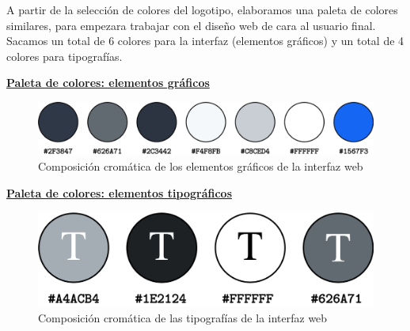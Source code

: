 \documentclass[../ei103948-project-documentation.tex]{subfiles}
\begin{document}
                            A partir de la selección de colores del logotipo, elaboramos una paleta de colores similares, para empezara trabajar con el diseño web de cara al usuario final.\\

                            Sacamos un total de 6 colores para la interfaz (elementos gráficos) y un total de 4 colores para tipografías.\\

                            \begin{center}
                                \underline{\textbf{Paleta de colores: elementos gráficos}}
                            \end{center}

                            \begin{figure}[H]
                                \begin{center}
                                \includegraphics[scale=0.065]{images/ColorTyposNoTable.png}
                                \end{center}
                                \caption{Composición cromática de los elementos gráficos de la interfaz web}
                            \end{figure}

                            \vspace{5mm}
                            \begin{center}
                                \underline{\textbf{Paleta de colores: elementos tipográficos}}
                            \end{center}

                            \begin{figure}[H]
                                \begin{center}
                                \includegraphics[scale=0.065]{images/ColorTypos2NoTable.png}
                                \end{center}
                                \caption{Composición cromática de las tipografías de la interfaz web}
                            \end{figure}
                            \vspace{5mm}
\end{document}
